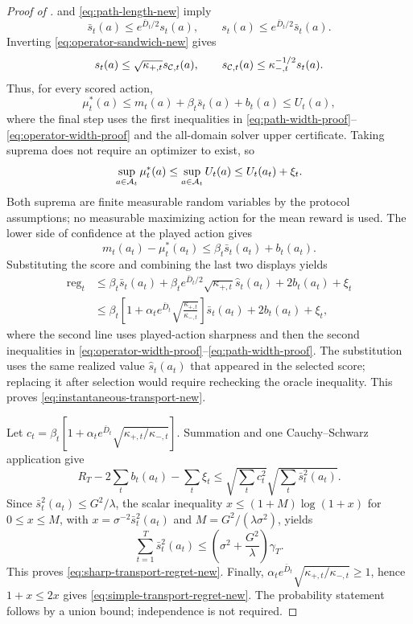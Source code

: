 \begin{proof}[Proof of ]
 and \eqref{eq:path-length-new} imply
\begin{equation}\label{eq:path-width-proof}
 \bar s_t(a)\le e^{\bar D_t/2}s_t(a),\qquad
 s_t(a)\le e^{\bar D_t/2}\bar s_t(a).
\end{equation}
Inverting \eqref{eq:operator-sandwich-new} gives
\begin{equation}\label{eq:operator-width-proof}
 s_t(a)\le\sqrt{\kappa_{+,t}}s_{\mathcal{C},t}(a),\qquad
 s_{\mathcal{C},t}(a)\le\kappa_{-,t}^{-1/2}s_t(a).
\end{equation}
Thus, for every scored action,
\[
 \mu_t^*(a)
 \le m_t(a)+\beta_t\bar s_t(a)+b_t(a)
 \le U_t(a),
\]
where the final step uses the first inequalities in
\eqref{eq:path-width-proof}--\eqref{eq:operator-width-proof} and the all-domain
solver upper certificate.  Taking suprema does not require an optimizer to
exist, so
\[
 \sup_{a\in\mathcal{A}_t}\mu_t^*(a)
 \le\sup_{a\in\mathcal{A}_t}U_t(a)
 \le U_t(a_t)+\xi_t.
\]
Both suprema are finite measurable random variables by the protocol assumptions;
no measurable maximizing action for the mean reward is used.
The lower side of confidence at the played action gives
\[
 m_t(a_t)-\mu_t^*(a_t)
 \le\beta_t\bar s_t(a_t)+b_t(a_t).
\]
Substituting the score and combining the last two displays yields
\begin{align*}
 \operatorname{reg}_t
 &\le\beta_t\bar s_t(a_t)
 +\beta_te^{\bar D_t/2}\sqrt{\kappa_{+,t}}\hat s_t(a_t)
 +2b_t(a_t)+\xi_t\\
 &\le\beta_t\!\left[1+\alpha_te^{\bar D_t}
 \sqrt{\frac{\kappa_{+,t}}{\kappa_{-,t}}}\right]\bar s_t(a_t)
 +2b_t(a_t)+\xi_t,
\end{align*}
where the second line uses played-action sharpness and then the second
inequalities in \eqref{eq:operator-width-proof}--\eqref{eq:path-width-proof}.
The substitution uses the same realized value $\hat s_t(a_t)$ that appeared in
the selected score; replacing it after selection would require rechecking the
oracle inequality.
This proves \eqref{eq:instantaneous-transport-new}.

Let
$c_t=\beta_t[1+\alpha_te^{\bar D_t}
\sqrt{\kappa_{+,t}/\kappa_{-,t}}]$.  Summation and one
Cauchy--Schwarz application give
\[
 R_T-2\sum_tb_t(a_t)-\sum_t\xi_t
 \le\sqrt{\sum_tc_t^2}\sqrt{\sum_t\bar s_t^2(a_t)}.
\]
Since $\bar s_t^2(a_t)\le G^2/\lambda$, the scalar inequality
$x\le(1+M)\log(1+x)$ for $0\le x\le M$, with
$x=\sigma^{-2}\bar s_t^2(a_t)$ and
$M=G^2/(\lambda\sigma^2)$, yields
\begin{equation}\label{eq:frozen-potential-proof}
 \sum_{t=1}^T\bar s_t^2(a_t)
 \le\left(\sigma^2+\frac{G^2}{\lambda}\right)\gamma_T.
\end{equation}
This proves \eqref{eq:sharp-transport-regret-new}.  Finally,
$\alpha_te^{\bar D_t}\sqrt{\kappa_{+,t}/\kappa_{-,t}}\ge1$, hence
$1+x\le2x$ gives \eqref{eq:simple-transport-regret-new}.  The probability
statement follows by a union bound; independence is not required.
\end{proof}

